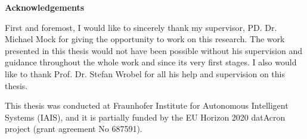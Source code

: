 

	\thispagestyle{empty}
{\noindent%
	\huge{\textbf{\textsf{Acknowledgements}}}
}
\vspace{2cm}
\begin{flushleft}
	\noindent%

\justify
\par First and foremost, I would like to sincerely thank my supervisor, PD. Dr. Michael Mock for giving the opportunity to work on this research. The work presented in this thesis would not have been possible without his supervision and guidance throughout the whole work and since its very first stages. I also would like to thank Prof. Dr. Stefan Wrobel for all his help and supervision on this thesis. 

\par This thesis was conducted at Fraunhofer Institute for Autonomous Intelligent Systems (IAIS), and it is partially funded by the EU Horizon 2020 datAcron project (grant agreement No 687591).

	
	
\end{flushleft}
